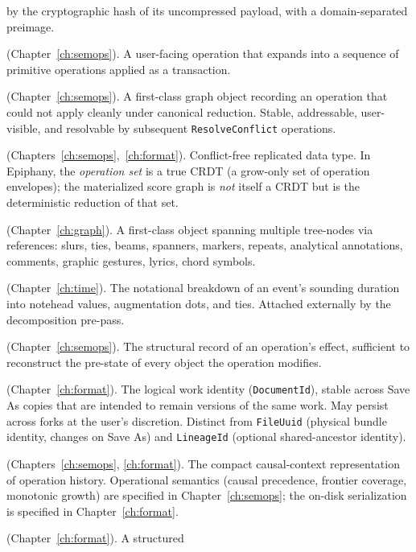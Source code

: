 \documentclass[11pt,letterpaper]{report}
\begin{document}
\begin{description}
    by the cryptographic hash of its uncompressed payload, with a
    domain-separated preimage.
  \item[Compound operation] (Chapter~\ref{ch:semops}). A user-facing
    operation that expands into a sequence of primitive operations
    applied as a transaction.
  \item[Conflict record] (Chapter~\ref{ch:semops}). A first-class
    graph object recording an operation that could not apply
    cleanly under canonical reduction. Stable, addressable,
    user-visible, and resolvable by subsequent
    \texttt{ResolveConflict} operations.
  \item[CRDT] (Chapters~\ref{ch:semops},~\ref{ch:format}).
    Conflict-free replicated data type. In Epiphany, the
    \emph{operation set} is a true CRDT (a grow-only set of
    operation envelopes); the materialized score graph is
    \emph{not} itself a CRDT but is the deterministic reduction
    of that set.
  \item[Cross-cutting structure] (Chapter~\ref{ch:graph}). A
    first-class object spanning multiple tree-nodes via references:
    slurs, ties, beams, spanners, markers, repeats, analytical
    annotations, comments, graphic gestures, lyrics, chord symbols.
  \item[Decomposition] (Chapter~\ref{ch:time}). The notational
    breakdown of an event's sounding duration into notehead values,
    augmentation dots, and ties. Attached externally by the
    decomposition pre-pass.
  \item[Delta] (Chapter~\ref{ch:semops}). The structural record of
    an operation's effect, sufficient to reconstruct the pre-state
    of every object the operation modifies.
  \item[Document identifier] (Chapter~\ref{ch:format}). The
    logical work identity (\texttt{DocumentId}), stable across
    Save As copies that are intended to remain versions of the
    same work. May persist across forks at the user's
    discretion. Distinct from \texttt{FileUuid}
    (physical bundle identity, changes on Save As) and
    \texttt{LineageId} (optional shared-ancestor identity).
  \item[Dotted version vector] (Chapters~\ref{ch:semops},
    \ref{ch:format}). The compact causal-context representation
    of operation history. Operational semantics (causal
    precedence, frontier coverage, monotonic growth) are
    specified in Chapter~\ref{ch:semops}; the on-disk
    serialization is specified in Chapter~\ref{ch:format}.
  \item[Edit barrier] (Chapter~\ref{ch:format}). A structured

\end{description}
\end{document}
